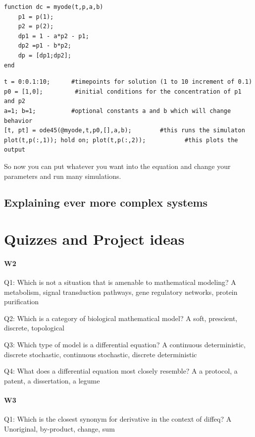 \begin{verbatim}
function dc = myode(t,p,a,b)
    p1 = p(1);
    p2 = p(2);
    dp1 = 1 - a*p2 - p1;
    dp2 =p1 - b*p2;
    dp = [dp1;dp2];
end
\end{verbatim}

\begin{verbatim}
t = 0:0.1:10;      #timepoints for solution (1 to 10 increment of 0.1)
p0 = [1,0];         #initial conditions for the concentration of p1 and p2
a=1; b=1;          #optional constants a and b which will change behavior
[t, pt] = ode45(@myode,t,p0,[],a,b);        #this runs the simulaton 
plot(t,p(:,1)); hold on; plot(t,p(:,2));           #this plots the output
\end{verbatim}

So now you can put whatever you want into the equation and change your parameters and run many simulations.  





\subsection{Explaining ever more complex systems}




\section{Quizzes and Project ideas}
\paragraph{W2}
Q1: Which is not a situation that is amenable to mathematical modeling?
A metabolism, signal transduction pathways, gene regulatory networks, protein purification

Q2: Which is a category of biological mathematical model?
A soft, prescient, discrete, topological

Q3: Which type of model is a differential equation?
A continuous deterministic, discrete stochastic, continuous stochastic, discrete deterministic

Q4: What does a differential equation most closely resemble?
A a protocol, a patent, a dissertation, a legume


\paragraph{W3}
Q1: Which is the closest synonym for derivative in the context of diffeq?
A Unoriginal, by-product, change, sum

